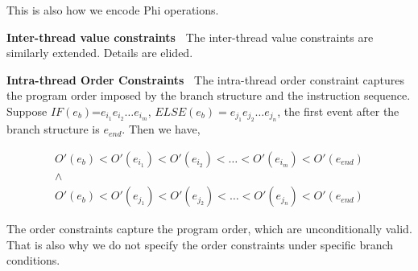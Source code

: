 This is also how we encode Phi operations.


{\bf Inter-thread value constraints\ } The inter-thread value constraints 
are similarly extended. Details are elided.


{\bf Intra-thread Order Constraints\ } The intra-thread order constraint captures the program order imposed by the branch structure and the instruction sequence. Suppose $IF(e_b)$=$e_{i_1}e_{i_2}\dots e_{i_m}$, $ELSE(e_b)=e_{j_1}e_{j_2}\dots e_{j_n}$, the first event after the branch structure is $e_{end}$. Then we have, 

$$
\begin{array}{l}
O'(e_b)<O'(e_{i_1})<O'(e_{i_2})<\dots <O'(e_{i_m})<O'(e_{end})\\
\wedge\\
O'(e_b)<O'(e_{j_1})<O'(e_{j_2})<\dots <O'(e_{j_n})<O'(e_{end})
\end{array}
$$

The order constraints capture the program order, which are unconditionally valid. That is also why we do not specify the order constraints under specific branch conditions. 






